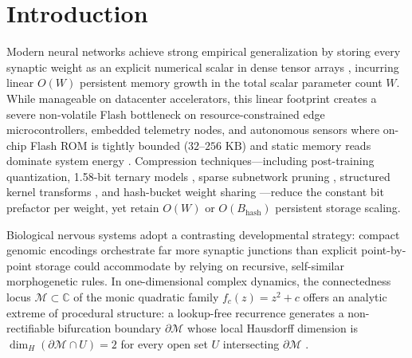 
\section{Introduction}
\label{sec:intro}

Modern neural networks achieve strong empirical generalization by storing every synaptic weight as an explicit numerical scalar in dense tensor arrays \cite{vaswani2017attention}, incurring linear $O(W)$ persistent memory growth in the total scalar parameter count $W$. While manageable on datacenter accelerators, this linear footprint creates a severe non-volatile Flash bottleneck on resource-constrained edge microcontrollers, embedded telemetry nodes, and autonomous sensors where on-chip Flash ROM is tightly bounded ($32\text{--}256\text{ KB}$) and static memory reads dominate system energy \cite{lin2020mcunet,stmicro2021stm32l}. Compression techniques---including post-training quantization, 1.58-bit ternary models \cite{ma2024bitnet}, sparse subnetwork pruning \cite{frankle2019lottery}, structured kernel transforms \cite{le2013fastfood}, and hash-bucket weight sharing \cite{chen2015hashednets}---reduce the constant bit prefactor per weight, yet retain $O(W)$ or $O(B_{\mathrm{hash}})$ persistent storage scaling.

Biological nervous systems adopt a contrasting developmental strategy: compact genomic encodings orchestrate far more synaptic junctions than explicit point-by-point storage could accommodate by relying on recursive, self-similar morphogenetic rules. In one-dimensional complex dynamics, the connectedness locus $\mathcal{M} \subset \mathbb{C}$ of the monic quadratic family $f_c(z) = z^2 + c$ \cite{mandelbrot1980fractal,mandelbrot1982fractal,douady1984etude,peitgen1986beauty} offers an analytic extreme of procedural structure: a lookup-free recurrence generates a non-rectifiable bifurcation boundary $\partial\mathcal{M}$ whose local Hausdorff dimension is $\dim_H(\partial\mathcal{M} \cap U) = 2$ for every open set $U$ intersecting $\partial\mathcal{M}$ \cite{shishikura1998hausdorff}.

